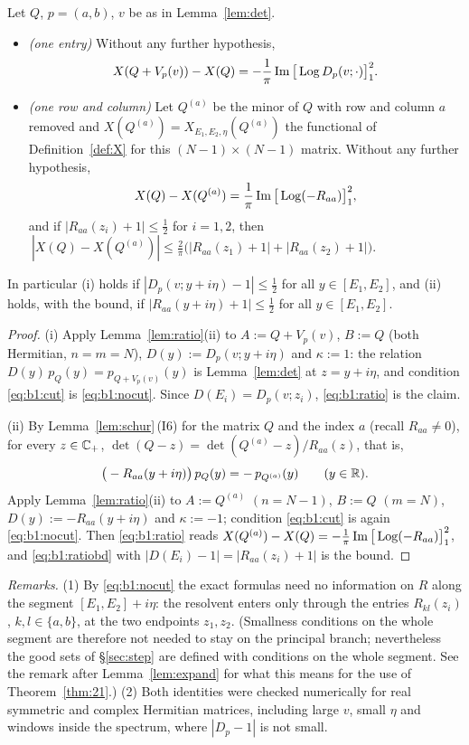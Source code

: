 \begin{corollary}\label{cor:Xchange}
Let $Q$, $p=(a,b)$, $v$ be as in Lemma~\ref{lem:det}.
\begin{itemize}\itemsep0pt
\item[\textup{(i)}] \emph{(one entry)} Without any further hypothesis,
\[
X(Q+V_p(v))-X(Q)=-\frac1\pi\operatorname{Im}\big[\operatorname{Log} D_p(v;\cdot)\big]_{1}^{2}.
\]
\item[\textup{(ii)}] \emph{(one row and column)} Let $Q^{(a)}$ be the minor of $Q$ with row and column $a$ removed and $X(Q^{(a)})=X_{E_1,E_2,\eta}(Q^{(a)})$ the
functional of Definition~\ref{def:X} for this $(N-1)\times(N-1)$ matrix. Without any further hypothesis,
\[
X(Q)-X(Q^{(a)})=\frac1\pi\operatorname{Im}\big[\operatorname{Log}(-R_{aa})\big]_{1}^{2} ,
\]
and if $|R_{aa}(z_i)+1|\le\frac12$ for $i=1,2$, then $\ |X(Q)-X(Q^{(a)})|\le\tfrac2\pi\big(|R_{aa}(z_1)+1|+|R_{aa}(z_2)+1|\big)$.
\end{itemize}
In particular \textup{(i)} holds if $|D_p(v;y+i\eta)-1|\le\frac12$ for all $y\in[E_1,E_2]$, and \textup{(ii)} holds, with the bound, if
$|R_{aa}(y+i\eta)+1|\le\frac12$ for all $y\in[E_1,E_2]$.
\end{corollary}
\begin{proof}
(i) Apply Lemma~\ref{lem:ratio}(ii) to $A:=Q+V_p(v)$, $B:=Q$ (both Hermitian, $n=m=N$), $D(y):=D_p(v;y+i\eta)$ and $\kappa:=1$: the relation
$D(y)\,p_Q(y)=p_{Q+V_p(v)}(y)$ is Lemma~\ref{lem:det} at $z=y+i\eta$, and condition \eqref{eq:b1:cut} is \eqref{eq:b1:nocut}. Since
$D(E_i)=D_p(v;z_i)$, \eqref{eq:b1:ratio} is the claim.

(ii) By Lemma~\ref{lem:schur}\,(I6) for the matrix $Q$ and the index $a$ (recall $R_{aa}\ne0$), for every $z\in\mathbb{C}_+$,
$\det(Q-z)=\det(Q^{(a)}-z)/R_{aa}(z)$, that is,
\[
\big(-R_{aa}(y+i\eta)\big)\,p_Q(y)=-\,p_{Q^{(a)}}(y)\qquad(y\in\mathbb{R}).
\]
Apply Lemma~\ref{lem:ratio}(ii) to $A:=Q^{(a)}$ $(n=N-1)$, $B:=Q$ $(m=N)$, $D(y):=-R_{aa}(y+i\eta)$ and $\kappa:=-1$; condition \eqref{eq:b1:cut} is
again \eqref{eq:b1:nocut}. Then \eqref{eq:b1:ratio} reads $X(Q^{(a)})-X(Q)=-\frac1\pi\operatorname{Im}\big[\operatorname{Log}(-R_{aa})\big]_{1}^{2}$, and \eqref{eq:b1:ratiobd} with
$|D(E_i)-1|=|R_{aa}(z_i)+1|$ is the bound.
\end{proof}

\noindent\emph{Remarks.} (1) By \eqref{eq:b1:nocut} the exact formulas need no information on $R$ along the segment $[E_1,E_2]+i\eta$: the resolvent
enters only through the entries $R_{kl}(z_i)$, $k,l\in\{a,b\}$, at the two endpoints $z_1,z_2$. (Smallness conditions on the whole
segment are therefore not needed to stay on the principal branch; nevertheless the good sets of \S\ref{sec:step} are defined with conditions on the whole segment.
See the remark after Lemma~\ref{lem:expand} for what this means for the use of Theorem~\ref{thm:21}.)
(2) Both identities were checked numerically for real symmetric and complex Hermitian matrices, including large $v$, small $\eta$ and windows
inside the spectrum, where $|D_p-1|$ is not small.
